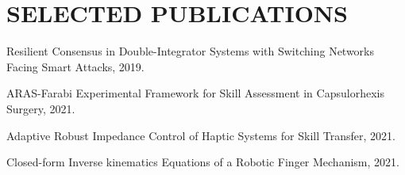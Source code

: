 \documentclass[11pt,a4paper,sans]{moderncv} %
\begin{document}
  
	\section{SELECTED PUBLICATIONS}
    \href{https://ieeexplore.ieee.org/abstract/document/9071915/}{\textcolor{gray}{\faCloudDownload} }Resilient Consensus in Double-Integrator Systems with Switching Networks Facing Smart Attacks, 2019.
	
    \href{https://ieeexplore.ieee.org/abstract/document/9663494/}{\textcolor{gray}{\faCloudDownload} }ARAS-Farabi Experimental Framework for Skill Assessment in Capsulorhexis Surgery, 2021.
    
    \href{https://ieeexplore.ieee.org/abstract/document/9663486/}{\textcolor{gray}{\faCloudDownload} }Adaptive Robust Impedance Control of Haptic Systems for Skill Transfer, 2021.	
    
    
    \href{https://ieeexplore.ieee.org/abstract/document/9663448/}{\textcolor{gray}{\faCloudDownload} }Closed-form Inverse kinematics Equations of a Robotic Finger Mechanism, 2021.
 
    
\end{document}

